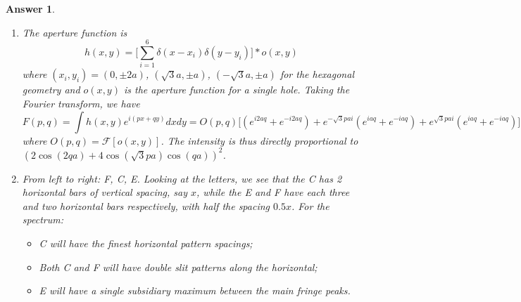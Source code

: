 \documentclass[a4paper]{article}
\newtheorem{ans}{Answer}[section]
\theoremstyle{new}
\begin{document}
\begin{ans}
\begin{enumerate}[label=(\alph*)]
The aperture function of this elliptical aperture $h_{ellipse}(x,y)$ equals to 1 if $(x/a)^2+(y/b)^2<1$ and zero otherwise. Using a change of coordinates $x'=x/a$ and $y'=y/b$, we can ensure the elliptical integration region becomes circular again. Alternatively, given that the scaled version of the Fourier transform is
$$\tilde{h}(x/a,y/b)=\frac{1}{|ab|}\tilde{h}(pa,qb)$$
then we have the final intensity to be directly proportional to 
$$\bigg(\frac{J_1(\sqrt{a^2p^2+q^2b^2})}{\sqrt{a^2p^2+b^2q^2}}\bigg)^2$$
\item The aperture function is
$$h(x,y)=\bigg[\sum_{i=1}^6\delta(x-x_i)\delta(y-y_i)\bigg]*o(x,y)$$
where $(x_i,y_i)=(0,\pm2a)$, $(\sqrt{3}a,\pm a)$, $(-\sqrt{3}a,\pm a)$ for the hexagonal geometry and $o(x,y)$ is the aperture function for a single hole. Taking the Fourier transform, we have
$$F(p,q)=\int h(x,y)e^{i(px+qy)}dxdy=O(p,q)\bigg[(e^{i2aq}+e^{-i2aq})+e^{-\sqrt{3}pai}(e^{iaq}+e^{-iaq})+e^{\sqrt{3}pai}(e^{iaq}+e^{-iaq})\bigg]$$
where $O(p,q)=\mathcal{F}[o(x,y)]$. The intensity is thus directly proportional to $(2\cos(2qa)+4\cos(\sqrt{3}pa)\cos(qa))^2$.
\item  From left to right: F, C, E. Looking at the letters, we see that the C has 2 horizontal bars of vertical spacing, say $x$, while the E and F have each three and two horizontal bars respectively, with half the spacing $0.5 x$. For the spectrum:
\begin{itemize}
    \item C will have the finest horizontal pattern spacings;
    \item Both C and F will have double slit patterns along the horizontal;
    \item E will have a single subsidiary maximum between the main fringe peaks.
    \end{itemize}
\end{enumerate}
\end{ans}
\end{document}
